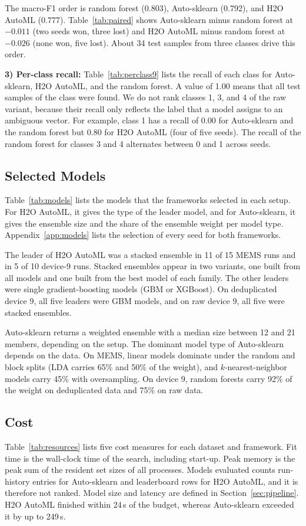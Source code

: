 The macro-F1 order is random forest (0.803), Auto-sklearn (0.792), and H2O AutoML (0.777). Table~\ref{tab:paired} shows Auto-sklearn minus random forest at $-0.011$ (two seeds won, three lost) and H2O AutoML minus random forest at $-0.026$ (none won, five lost). About 34 test samples from three classes drive this order.

\textbf{3) Per-class recall:} Table~\ref{tab:perclass9} lists the recall of each class for Auto-sklearn, H2O AutoML, and the random forest. A value of 1.00 means that all test samples of the class were found. We do not rank classes 1, 3, and 4 of the raw variant, because their recall only reflects the label that a model assigns to an ambiguous vector. For example, class 1 has a recall of 0.00 for Auto-sklearn and the random forest but 0.80 for H2O AutoML (four of five seeds). The recall of the random forest for classes 3 and 4 alternates between 0 and 1 across seeds.



\subsection{Selected Models}
Table~\ref{tab:models} lists the models that the frameworks selected in each setup. For H2O AutoML, it gives the type of the leader model, and for Auto-sklearn, it gives the ensemble size and the share of the ensemble weight per model type. Appendix~\ref{app:models} lists the selection of every seed for both frameworks.

The leader of H2O AutoML was a stacked ensemble in 11 of 15 MEMS runs and in 5 of 10 device-9 runs. Stacked ensembles appear in two variants, one built from all models and one built from the best model of each family. The other leaders were single gradient-boosting models (GBM or XGBoost). On deduplicated device 9, all five leaders were GBM models, and on raw device 9, all five were stacked ensembles.

Auto-sklearn returns a weighted ensemble with a median size between 12 and 21 members, depending on the setup. The dominant model type of Auto-sklearn depends on the data. On MEMS, linear models dominate under the random and block splits (LDA carries 65\% and 50\% of the weight), and $k$-nearest-neighbor models carry 45\% with oversampling. On device 9, random forests carry 92\% of the weight on deduplicated data and 75\% on raw data.


\subsection{Cost}
Table~\ref{tab:resources} lists five cost measures for each dataset and framework. Fit time is the wall-clock time of the search, including start-up. Peak memory is the peak sum of the resident set sizes of all processes. Models evaluated counts run-history entries for Auto-sklearn and leaderboard rows for H2O AutoML, and it is therefore not ranked. Model size and latency are defined in Section~\ref{sec:pipeline}. H2O AutoML finished within 24\,s of the budget, whereas Auto-sklearn exceeded it by up to 249\,s.

